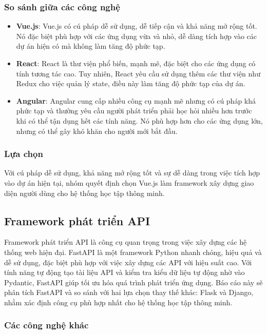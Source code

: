 \subsubsection{So sánh giữa các công nghệ}

\begin{itemize} \item \textbf{Vue.js}: Vue.js có cú pháp dễ sử dụng, dễ tiếp cận và khả năng mở rộng tốt. Nó đặc biệt phù hợp với các ứng dụng vừa và nhỏ, dễ dàng tích hợp vào các dự án hiện có mà không làm tăng độ phức tạp. \item \textbf{React}: React là thư viện phổ biến, mạnh mẽ, đặc biệt cho các ứng dụng có tính tương tác cao. Tuy nhiên, React yêu cầu sử dụng thêm các thư viện như Redux cho việc quản lý state, điều này làm tăng độ phức tạp của dự án. \item \textbf{Angular}: Angular cung cấp nhiều công cụ mạnh mẽ nhưng có cú pháp khá phức tạp và thường yêu cầu người phát triển phải học hỏi nhiều hơn trước khi có thể tận dụng hết các tính năng. Nó phù hợp hơn cho các ứng dụng lớn, nhưng có thể gây khó khăn cho người mới bắt đầu. \end{itemize}

\subsubsection{Lựa chọn}

Với cú pháp dễ sử dụng, khả năng mở rộng tốt và sự dễ dàng trong việc tích hợp vào dự án hiện tại, nhóm quyết định chọn Vue.js làm framework xây dựng giao diện người dùng cho hệ thống học tập thông minh.
\subsection{Framework phát triển API}

Framework phát triển API là công cụ quan trọng trong việc xây dựng các hệ thống web hiện đại. FastAPI là một framework Python nhanh chóng, hiệu quả và dễ sử dụng, đặc biệt phù hợp với việc xây dựng các API với hiệu suất cao. Với tính năng tự động tạo tài liệu API và kiểm tra kiểu dữ liệu tự động nhờ vào Pydantic, FastAPI giúp tối ưu hóa quá trình phát triển ứng dụng. Báo cáo này sẽ phân tích FastAPI và so sánh với hai lựa chọn thay thế khác: Flask và Django, nhằm xác định công cụ phù hợp nhất cho hệ thống học tập thông minh.

\subsubsection{Các công nghệ khác}

